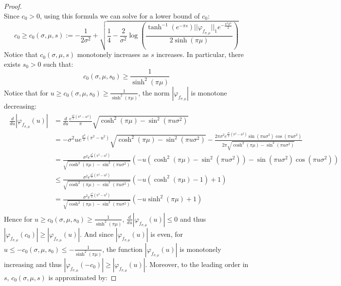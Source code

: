\documentclass[a4paper,11pt]{article}
\theoremstyle{definition}
\newcommand{\lb}{\left(}
\newcommand{\rb}{\right)}
\begin{document}
\begin{proof}
\begin{equation}
    \end{equation}
    Since $c_0 > 0$, using this formula we can solve for a lower bound of $c_0$:
    \begin{equation}
        c_0 \geq c_0(\sigma, \mu, s) := -\frac{1}{2\sigma^2} + \sqrt{\frac{1}{4} - \frac{2}{\sigma^2}\log\lb\frac{\tanh^{-1}(e^{-\pi s})||\varphi_{f_{\sigma,\mu}}||_1 e^{-\frac{\pi^2\sigma^2}{2}}}{2\sinh(\pi\mu)}\rb}
    \end{equation}
    Notice that $c_0(\sigma,\mu, s)$ monotonely increases as $s$ increases. In particular, there exists $s_0 > 0$ such that:
    \begin{equation}
        c_0(\sigma,\mu,s_0) \geq \frac{1}{\sinh^2(\pi\mu)}
    \end{equation}
    Notice that for $u \geq c_0(\sigma,\mu,s_0)\geq \frac{1}{\sinh^2(\pi\mu)}$, the norm $|\varphi_{f_{\sigma,\mu}}|$ is monotone decreasing:
    {\small
\begin{align}
        \begin{split}
            \frac{d}{du}|\varphi_{f_{\sigma,\mu}}(u)| 
            &=\frac{d}{du}\frac{e^{\frac{\sigma^2}{2}(\pi^2 - u^2)}}{\pi}\sqrt{\cosh^2(\pi\mu) - \sin^2(\pi u\sigma^2)}
            \\&= -\sigma^2 u e^{\frac{\sigma^2}{2}(\pi^2 - u^2)}\sqrt{\cosh^2(\pi\mu) - \sin^2(\pi u \sigma^2)} - \frac{2\pi\sigma^2e^{\frac{\sigma^2}{2}(\pi^2 - u^2)}\sin(\pi u\sigma^2)\cos(\pi u \sigma^2)}{2\pi\sqrt{\cosh^2(\pi\mu) - \sin^2(\pi u \sigma^2)}}
            \\&
            =\frac{\sigma^2 e^{\frac{\sigma^2}{2}(\pi^2 - u^2)}}{\sqrt{\cosh^2(\pi\mu) - \sin^2(\pi u\sigma^2)}}\lb -u\lb \cosh^2(\pi\mu) - \sin^2(\pi u \sigma^2) \rb - \sin(\pi u \sigma^2)\cos(\pi u \sigma^2) \rb
            \\&
            \leq \frac{\sigma^2 e^{\frac{\sigma^2}{2}(\pi^2 - u^2)}}{\sqrt{\cosh^2(\pi\mu) - \sin^2(\pi u \sigma^2)}}\lb -u\lb \cosh^2(\pi\mu) - 1 \rb + 1 \rb
            \\&
            =\frac{\sigma^2 e^{\frac{\sigma^2}{2}(\pi^2 - u^2)}}{\sqrt{\cosh^2(\pi\mu) - \sin^2(\pi u \sigma^2)}}\lb  -u\sinh^2(\pi\mu) + 1\rb
        \end{split}
    \end{align}
}
    Hence for $u \geq c_0(\sigma,\mu,s_0) \geq \frac{1}{\sinh^2(\pi\mu)}$, $\frac{d}{du}|\varphi_{f_{\sigma,\mu}}(u)| \leq 0$ and thus $|\varphi_{f_{\sigma,\mu}}(c_0)| \geq |\varphi_{f_{\sigma,\mu}}(u)|$. And since $|\varphi_{f_{\sigma,\mu}}(u)|$ is even, for $u \leq -c_0(\sigma,\mu, s_0)\leq -\frac{1}{\sinh^2(\pi\mu)}$, the function $|\varphi_{f_{\sigma,\mu}}(u)|$ is monotonely increasing and thus $|\varphi_{f_{\sigma,\mu}}(-c_0)|\geq |\varphi_{f_{\sigma,\mu}}(u)|$. Moreover, to the leading order in $s$, $c_0(\sigma,\mu, s)$ is approximated by:

\end{proof}
\end{document}

